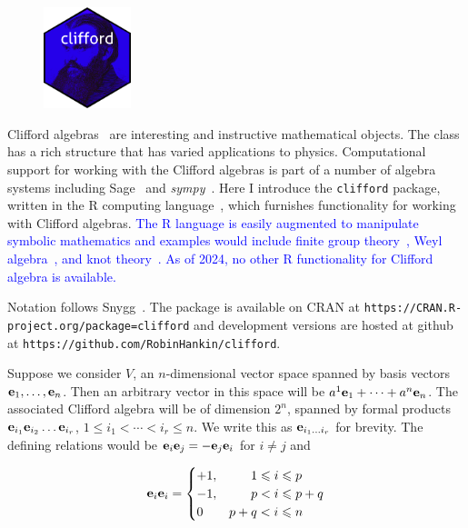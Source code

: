 \documentclass{birkjour}
\theoremstyle{definition}
\theoremstyle{remark}
\numberwithin{equation}{section}
\begin{document}
\setlength{\intextsep}{0pt}
\begin{figure}
  \begin{center}
\includegraphics[width=1in]{clifford.png}
  \end{center}
\end{figure}
Clifford algebras~\cite{hestenes1987} are interesting and instructive
mathematical objects.  The class has a rich structure that has varied
applications to physics.  Computational support for working with the
Clifford algebras is part of a number of algebra systems including
Sage~\cite{sagemath2019} and \textit{sympy}~\cite{sympy2017}.  Here I
introduce the {\tt clifford} package, written in the R computing
language~\cite{rcore2022}, which furnishes functionality for working
with Clifford algebras.  \textcolor{blue}{The R language is easily
  augmented to manipulate symbolic mathematics and examples would
  include finite group theory~\cite{hankin2020_permutations}, Weyl
  algebra~\cite{hankin2022_weyl_arxiv}, and knot
  theory~\cite{hankin2023}.  As of 2024, no other R functionality for
  Clifford algebra is available.}

Notation follows Snygg~\cite{snygg2010}.  The
package is available on CRAN at
\verb+https://CRAN.R-project.org/package=clifford+ and development
versions are hosted at github at
\verb+https://github.com/RobinHankin/clifford+.


\newcommand{\ei}[1]{\ensuremath{{\bf e}_{#1}}}


Suppose we consider $V$, an $n$-dimensional vector space spanned by basis vectors
$\ei{1},\ldots,\ei{n}$.  Then an arbitrary vector in this space will
be $a^1\ei{1}+\cdots+a^n\ei{n}$.  The associated Clifford algebra will
be of dimension $2^n$, spanned by formal products
$\ei{i_1}\ei{i_2}\ldots\ei{i_r}$, $1\leqslant i_1<\cdots<i_r\leqslant
n$.  We write this as $\ei{i_1\ldots i_r}$ for brevity.  The defining
relations would be $\ei{i}\ei{j}=-\ei{j}\ei{i}$ for $i\neq j$ and

\textcolor{blue}{
\begin{equation}\label{posdefcliff2}
\ei{i}\ei{i} = \begin{cases}
    +1, & \hphantom{p+{}}1\leqslant i\leqslant p\\
    -1, & \hphantom{p+{}}p < i\leqslant p+q\\
    0   & p+q < i\leqslant n
  \end{cases}
\end{equation}
}
\end{document}
